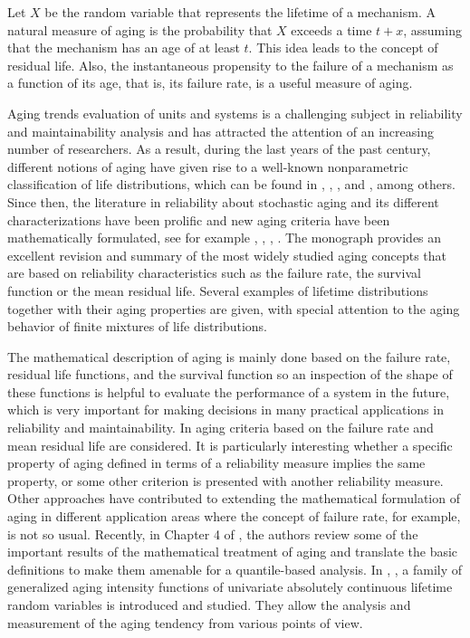 \documentclass[preprint,12pt]{elsarticle}
\begin{document}
Let $X$ be the random variable that represents the lifetime of a mechanism. A natural measure of aging is the probability that $X$ exceeds a time $t + x$, assuming that the mechanism has an age of at least $t$. This idea leads to the concept of residual life. Also, the instantaneous propensity to the failure of a mechanism as a function of its age, that is, its failure rate, is a useful measure of aging. 
 
Aging trends evaluation of units and systems is a challenging subject in reliability and maintainability analysis and has attracted the attention of an increasing number of researchers. As a  result,  during the last years of the past century, different notions of aging  have given rise to a well-known nonparametric classification of life distributions,  which can be found in \cite{BS69}, \cite{BP75}, \cite{HP84}, \cite{DKS86} and \cite{CW91}, among others.  Since then, the literature in reliability about stochastic aging and its different characterizations have been prolific and new aging criteria have been mathematically formulated, see for example \cite{FPS2014}, \cite{NASS2014}, \cite{Sz2018a}, \cite{Sz2018b}. The monograph \cite{LX06}  provides an excellent revision and summary of the most widely studied aging concepts that are based on reliability characteristics such as the failure rate, the survival function or the mean residual life. Several examples of lifetime distributions together with their aging properties are given, with special attention to the aging behavior of finite mixtures of life distributions. 

The mathematical description of aging is mainly done based on the failure rate, residual life functions, and the survival function so an inspection of the shape of these functions is helpful to evaluate the performance of a system in the future, which is very important for making decisions in many practical applications in reliability and maintainability.
In \cite{Lillo00} aging criteria based on the failure rate and mean residual life are considered. It is particularly interesting whether a specific property of aging defined in terms of a reliability measure implies the same property, or some other criterion is presented with another reliability measure. 
Other approaches have  contributed to extending the mathematical formulation of aging in different application areas where the concept of failure rate, for example, is not so usual. Recently, in Chapter 4 of \cite{NSB2013}, the authors review some of the important results of the mathematical treatment of aging and translate the basic definitions to make them amenable for a quantile-based analysis. In \cite{Sz2018a}, \cite{Sz2018b}, a family of generalized aging intensity functions of univariate absolutely continuous lifetime random variables is introduced and studied. They allow the analysis and measurement of the aging tendency from various points of view.
\end{document}
